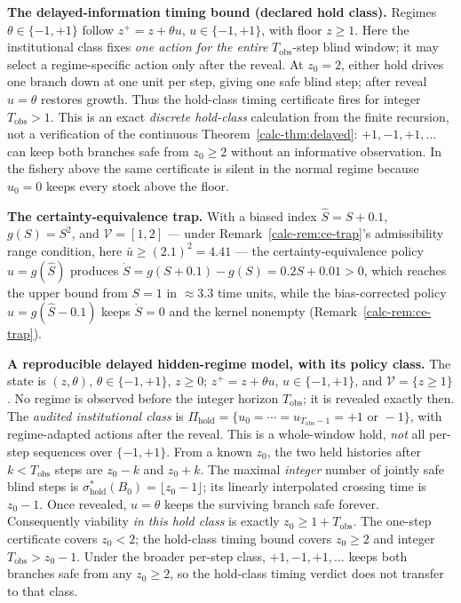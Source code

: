 \documentclass[10pt,twocolumn]{article}
\theoremstyle{definition}
\begin{document}
\textbf{The delayed-information timing bound (declared hold class).}
Regimes \(\theta\in\{-1,+1\}\) follow \(z^{+}=z+\theta u\),
\(u\in\{-1,+1\}\), with floor \(z\ge1\). Here the institutional
class fixes \emph{one action for the entire} \(T_{\mathrm{obs}}\)-step
blind window; it may select a regime-specific action only after the
reveal. At \(z_0=2\), either hold drives one branch down at one unit
per step, giving one safe blind step; after reveal \(u=\theta\)
restores growth. Thus the hold-class timing certificate fires for
integer \(T_{\mathrm{obs}}>1\). This is an exact \emph{discrete hold-class} calculation from the
finite recursion, not a verification of the continuous Theorem~\ref{calc-thm:delayed}: \(+1,-1,+1,\ldots\) can keep both branches safe from
\(z_0\ge2\) without an informative observation. In the fishery above
the same certificate is silent in the normal regime because \(u_0=0\)
keeps every stock above the floor.

\textbf{The certainty-equivalence trap.} With a biased index \(\hat{S} = S + 0.1\), \(g(S) = S^{2}\), and \(\mathcal{V} = [1,2]\) --- under Remark~\ref{calc-rem:ce-trap}'s admissibility range condition, here \(\bar u \ge (2.1)^{2} = 4.41\) --- the certainty-equivalence policy \(u = g(\hat{S})\) produces \(\dot{S} = g(S+0.1) - g(S) = 0.2S + 0.01 > 0\), which reaches the upper bound from \(S = 1\) in \(\approx 3.3\) time units, while the bias-corrected policy \(u = g(\hat{S} - 0.1)\) keeps \(\dot{S} = 0\) and the kernel nonempty (Remark~\ref{calc-rem:ce-trap}).

\textbf{A reproducible delayed hidden-regime model, with its policy class.}
The state is \((z,\theta)\), \(\theta\in\{-1,+1\}\), \(z\ge0\);
\(z^{+}=z+\theta u\), \(u\in\{-1,+1\}\), and
\(\mathcal V=\{z\ge1\}\). No regime is observed before the integer
horizon \(T_{\mathrm{obs}}\); it is revealed exactly then. The \emph{audited
institutional class} is
\(\Pi_{\mathrm{hold}}=\{u_0=\cdots=u_{T_{\mathrm{obs}}-1}
=+1\text{ or }-1\}\), with regime-adapted actions after the reveal.
This is a whole-window hold, \emph{not} all per-step sequences over
\(\{-1,+1\}\). From a known \(z_0\), the two held histories after
\(k<T_{\mathrm{obs}}\) steps are \(z_0-k\) and \(z_0+k\).
The maximal \emph{integer} number of jointly safe blind steps is
\(\sigma^*_{\mathrm{hold}}(B_0)=\lfloor z_0-1\rfloor\); its linearly
interpolated crossing time is \(z_0-1\). Once revealed, \(u=\theta\)
keeps the surviving branch safe forever. Consequently viability
\emph{in this hold class} is exactly \(z_0\ge1+T_{\mathrm{obs}}\).
The one-step certificate covers \(z_0<2\); the hold-class timing
bound covers \(z_0\ge2\) and integer
\(T_{\mathrm{obs}}>z_0-1\). Under the broader per-step class,
\(+1,-1,+1,\ldots\) keeps both branches safe from any \(z_0\ge2\),
so the hold-class timing verdict does not transfer to that class.
\end{document}
